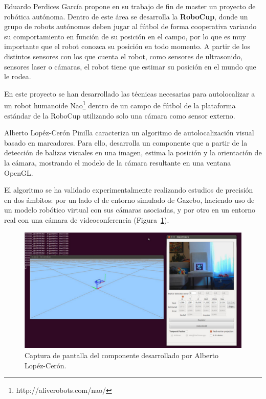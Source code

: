 Eduardo Perdices García \parencite{ref3} propone en su trabajo de fin de master un proyecto de robótica autónoma. Dentro de este área se desarrolla la \textbf{RoboCup}, donde un grupo de robots autónomos deben jugar al fútbol de forma cooperativa variando su comportamiento en función de su posición en el campo, por lo que es muy importante que el robot conozca su posición en todo momento. A partir de los distintos sensores con los que cuenta el robot, como sensores de ultrasonido, sensores laser o cámaras, el robot tiene que estimar su posición en el mundo que le rodea.

En este proyecto se han desarrollado las técnicas necesarias para autolocalizar a un robot humanoide Nao\footnote{http://aliverobots.com/nao/} dentro de un campo de fútbol de la plataforma estándar de la RoboCup utilizando solo una cámara como sensor externo.

Alberto Lopéz-Cerón Pinilla \parencite{ref2} caracteriza un algoritmo de autolocalización visual basado en marcadores. Para ello, desarrolla un componente que a partir de la detección de balizas visuales en una imagen, estima la posición y la orientación de la cámara, mostrando el modelo de la cámara resultante en una ventana OpenGL.

El algoritmo se ha validado experimentalmente realizando estudios de precisión en dos ámbitos: por un lado el de entorno simulado de Gazebo, haciendo uso de un modelo robótico virtual con sus cámaras asociadas, y por otro en un entorno real con una cámara de videoconferencia (Figura~\ref{fig:ceron}).

\begin{figure}[th]
\centering
\includegraphics[scale=0.35]{Figures/cap-ceron.png}
\decoRule
\caption[Captura de pantalla, TFM de Alberto Lopéz-Cerón]{Captura de pantalla del componente desarrollado por Alberto Lopéz-Cerón.}
\label{fig:ceron}
\end{figure}

